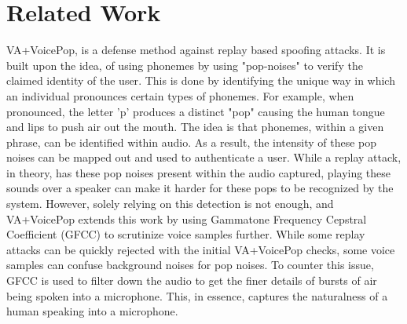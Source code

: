\section{Related Work}
VA+VoicePop\cite{b2}, is a defense method against replay based spoofing attacks. It is built upon the idea, of using phonemes by using "pop-noises" to verify the claimed identity of the user\cite{b4}. This is done by identifying the unique way in which an individual pronounces certain types of phonemes. For example, when pronounced, the letter 'p' produces a distinct "pop" causing the human tongue and lips to push air out the mouth. The idea is that phonemes, within a given phrase, can be identified within audio. As a result, the intensity of these pop noises can be mapped out and used to authenticate a user. While a replay attack, in theory, has these pop noises present within the audio captured, playing these sounds over a speaker can make it harder for these pops to be recognized by the system. However, solely relying on this detection is not enough, and VA+VoicePop extends this work by using Gammatone Frequency Cepstral Coefficient (GFCC) to scrutinize voice samples further. While some replay attacks can be quickly rejected with the initial VA+VoicePop checks, some voice samples can confuse background noises for pop noises. To counter this issue, GFCC is used to filter down the audio to get the finer details of bursts of air being spoken into a microphone. This, in essence, captures the naturalness of a human speaking into a microphone.


